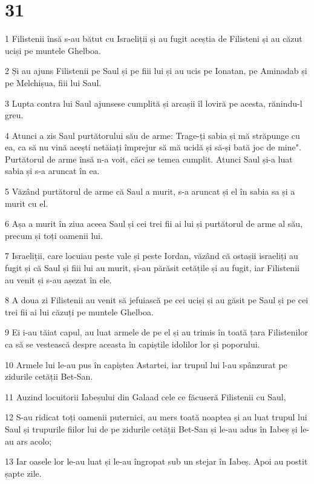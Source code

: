\chapter{31}

\par 1 Filistenii însă s-au bătut cu Israeliții și au fugit aceștia de Filisteni și au căzut uciși pe muntele Ghelboa.
\par 2 Și au ajuns Filistenii pe Saul și pe fiii lui și au ucis pe Ionatan, pe Aminadab și pe Melchișua, fiii lui Saul.
\par 3 Lupta contra lui Saul ajunsese cumplită și arcașii îl loviră pe acesta, rănindu-l greu.
\par 4 Atunci a zis Saul purtătorului său de arme: Trage-ți sabia și mă străpunge cu ea, ca să nu vină acești netăiați împrejur să mă ucidă și să-și bată joc de mine". Purtătorul de arme însă n-a voit, căci se temea cumplit. Atunci Saul și-a luat sabia și s-a aruncat în ea.
\par 5 Văzând purtătorul de arme că Saul a murit, s-a aruncat și el în sabia sa și a murit cu el.
\par 6 Așa a murit în ziua aceea Saul și cei trei fii ai lui și purtătorul de arme al său, precum și toți oamenii lui.
\par 7 Israeliții, care locuiau peste vale și peste Iordan, văzând că ostașii israeliți au fugit și că Saul și fiii lui au murit, și-au părăsit cetățile și au fugit, iar Filistenii au venit și s-au așezat în ele.
\par 8 A doua zi Filistenii au venit să jefuiască pe cei uciși și au găsit pe Saul și pe cei trei fii ai lui căzuți pe muntele Ghelboa.
\par 9 Ei i-au tăiat capul, au luat armele de pe el și au trimis în toată țara Filistenilor ca să se vestească despre aceasta în capiștile idolilor lor și poporului.
\par 10 Armele lui le-au pus în capiștea Astartei, iar trupul lui l-au spânzurat pe zidurile cetății Bet-San.
\par 11 Auzind locuitorii Iabeșului din Galaad cele ce făcuseră Filistenii cu Saul,
\par 12 S-au ridicat toți oamenii puternici, au mers toată noaptea și au luat trupul lui Saul și trupurile fiilor lui de pe zidurile cetății Bet-San și le-au adus în Iabeș și le-au ars acolo;
\par 13 Iar oasele lor le-au luat și le-au îngropat sub un stejar în Iabeș. Apoi au postit șapte zile.


